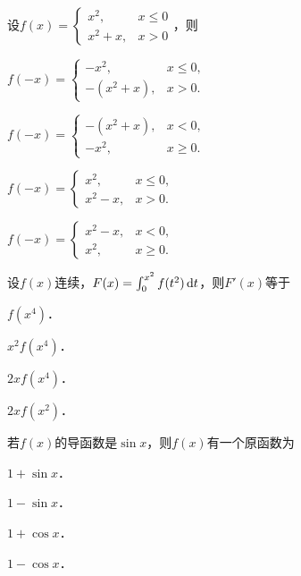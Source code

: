 \documentclass[plain,noanswer,medmath]{../../template/jnuexam}
\begin{document}
\begin{problem}
设$f(x) = \begin{cases}
      x^2, & x \le 0 \\
  x^2 + x, & x > 0
\end{cases}$，则\pickout{}
\begin{abcd}
\item $f(- x) = \begin{cases}
        -x^2, & x \le 0, \\
  -(x^2 + x), & x > 0.
\end{cases}$
\item $f(- x) = \begin{cases}
  -(x^2 + x), & x < 0, \\
        -x^2, & x \ge 0.
\end{cases}$
\item $f(- x) = \begin{cases}
      x^2, & x \le 0, \\
  x^2 - x, & x > 0.
\end{cases}$
\item $f(- x) = \begin{cases}
  x^2 - x, & x < 0, \\
      x^2, & x \ge 0.
\end{cases}$
\end{abcd}
\end{problem}




\begin{problem}
设$f(x)$连续，$F(x) = \int_0^{x^2} f(t^2)\mathop{}\!\mathrm{d} t$，则$F'(x)$等于\pickout{}
\begin{abcd}
\item $f(x^4)$．
\item $x^2 f(x^4)$．
\item $2xf(x^4)$．
\item $2xf(x^2)$．
\end{abcd}
\end{problem}


\begin{problem}
若$f(x)$的导函数是$\sin x$，则$f(x)$有一个原函数为\pickout{}
\begin{abcd}
\item $1 + \sin x$．    
\item $1 - \sin x$．    
\item $1 + \cos x$．    
\item $1 - \cos x$．
\end{abcd}
\end{problem}
\end{document}
